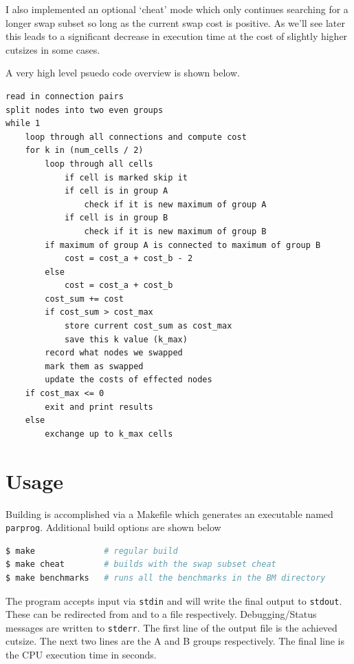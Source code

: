 \documentclass[10pt]{article}
\begin{document}
I also implemented an optional `cheat' mode which only continues searching for
a longer swap subset so long as the current swap cost is positive. As we'll see
later this leads to a significant decrease in execution time at the cost of
slightly higher cutsizes in some cases.

A very high level psuedo code overview is shown below.
\begin{lstlisting}[caption=Implementation Psuedo Code]
read in connection pairs
split nodes into two even groups
while 1
    loop through all connections and compute cost
    for k in (num_cells / 2)
        loop through all cells
            if cell is marked skip it
            if cell is in group A
                check if it is new maximum of group A
            if cell is in group B
                check if it is new maximum of group B
        if maximum of group A is connected to maximum of group B
            cost = cost_a + cost_b - 2
        else
            cost = cost_a + cost_b
        cost_sum += cost
        if cost_sum > cost_max
            store current cost_sum as cost_max
            save this k value (k_max)
        record what nodes we swapped
        mark them as swapped
        update the costs of effected nodes
    if cost_max <= 0
        exit and print results
    else
        exchange up to k_max cells
\end{lstlisting}

\newpage
\section{Usage}

Building is accomplished via a Makefile which generates an executable named
\texttt{parprog}.  Additional build options are shown below

\begin{lstlisting}[language=bash]
$ make              # regular build
$ make cheat        # builds with the swap subset cheat
$ make benchmarks   # runs all the benchmarks in the BM directory
\end{lstlisting}

The program accepts input via \texttt{stdin} and will write the final output to
\texttt{stdout}.  These can be redirected from and to a file respectively.
Debugging/Status messages are written to \texttt{stderr}. The first line of the
output file is the achieved cutsize. The next two lines are the A and B groups
respectively.  The final line is the CPU execution time in seconds.
\end{document}
